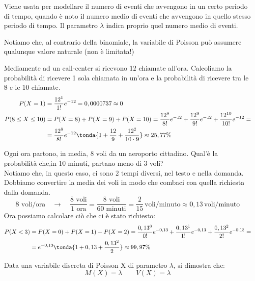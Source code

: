 Viene usata per modellare il numero di eventi che avvengono in un certo periodo di tempo, quando è noto il numero medio di eventi che avvengono in quello stesso periodo di tempo. Il parametro \(\lambda\) indica proprio quel numero medio di eventi.

\begin{osservazione} Notiamo che, al contrario della binomiale, la variabile di Poisson può assumere qualunque valore naturale (non è limitata!)
\end{osservazione}

\begin{esempio} Mediamente ad un call-center si ricevono 12 chiamate all'ora. Calcoliamo la probabilità di ricevere 1 sola chiamata in un'ora e la probabilità di ricevere tra le 8 e le 10 chiamate.
\[\begin{split}P(X=1) &= \dfrac{12^1}{1!} e^{-12} = 0,0000737 \approx 0 \\
P(8\leq X\leq 10) &= P(X = 8)+P(X=9)+P(X=10) = \dfrac{12^8}{8!} e^{-12} + \dfrac{12^9}{9!} e^{-12} + \dfrac{12^{10}}{10!} e^{-12} =\\
&= \dfrac{12^8}{8!} e^{-12} \tonda{1+\dfrac{12}{9}+\dfrac{12^2}{10\cdot 9}} \approx 25,77 \%\end{split}\]
\end{esempio}

\begin{esempio} Ogni ora partono, in media, 8 voli da un aeroporto cittadino. Qual'è la probabilità che,in 10 minuti, partano meno di 3 voli?\\[5pt]
Notiamo che, in questo caso, ci sono 2 tempi diversi, nel testo e nella domanda. Dobbiamo convertire la media dei voli in modo che combaci con quella richiesta dalla domanda.
\[\text{8 voli/ora} \quad \longrightarrow \quad \dfrac{\text{8 voli}}{\text{1 ora}}=\dfrac{\text{8 voli}}{\text{60 minuti}} = \dfrac{2}{15}\,\text{voli/minuto} \approx 0,13\,\text{voli/minuto}\]
Ora possiamo calcolare ciò che ci è stato richiesto:
\[\begin{split}P(X<3) &= P(X=0)+P(X=1)+P(X=2) = \dfrac{0,13^{0}}{0!} e^{-0,13}+\dfrac{0,13^{1}}{1!} e^{-0,13}+\dfrac{0,13^{2}}{2!} e^{-0,13}=\\
&= e^{-0,13} \tonda{1+0,13+\dfrac{0,13^2}{2}} \approx 99,97 \% \end{split}\]
\end{esempio}

\begin{proprieta} Data una variabile discreta di Poisson X di parametro \(\lambda\), si dimostra che: 
\[\boxed{M(X) = \lambda} \qquad \boxed{V(X) = \lambda}\]
\end{proprieta}

